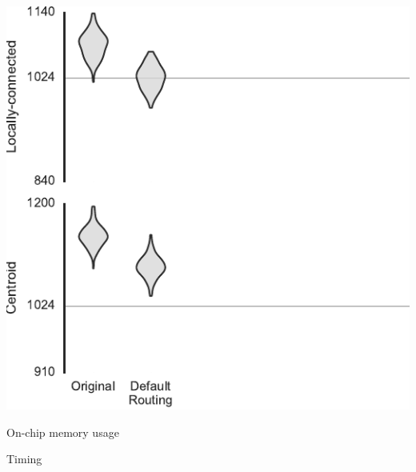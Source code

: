 \documentclass[t]{beamer}
\begin{document}
\begin{frame}[plain]{}
  \begin{center}
    \includegraphics[page=5]{../experiments/presentation_plots}
  \end{center}
\end{frame}

\begin{frame}{On-chip memory usage}
  
\end{frame}

\begin{frame}{Timing}
  
\end{frame}

\begin{darkframes}
\end{darkframes}
\end{document}
